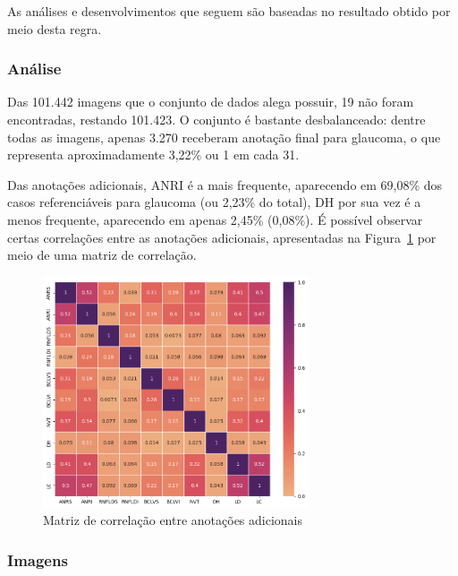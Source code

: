 \documentclass[12pt]{article}
\begin{document}

As análises e desenvolvimentos que seguem são baseadas no resultado obtido por meio desta regra.

\subsubsection{Análise}
\label{sec:dataset:analysis}
Das 101.442 imagens que o conjunto de dados alega possuir, 19 não foram encontradas, restando 101.423. O conjunto é bastante desbalanceado: dentre todas as imagens, apenas 3.270 receberam anotação final para glaucoma, o que representa aproximadamente 3,22\% ou 1 em cada 31.

Das anotações adicionais, ANRI é a mais frequente, aparecendo em 69,08\% dos casos referenciáveis para glaucoma (ou 2,23\% do total), DH por sua vez é a menos frequente, aparecendo em apenas 2,45\% (0,08\%). É possível observar certas correlações entre as anotações adicionais, apresentadas na Figura~\ref{fig:labels_correlation} por meio de uma matriz de correlação.

\begin{figure}[htb]
 \centering
 \includegraphics[width=0.7\textwidth]{images/correlation.png}
 \caption{Matriz de correlação entre anotações adicionais}
 \label{fig:labels_correlation}
\end{figure}

\subsubsection{Imagens}
\label{sec:dataset:images}
\end{document}
